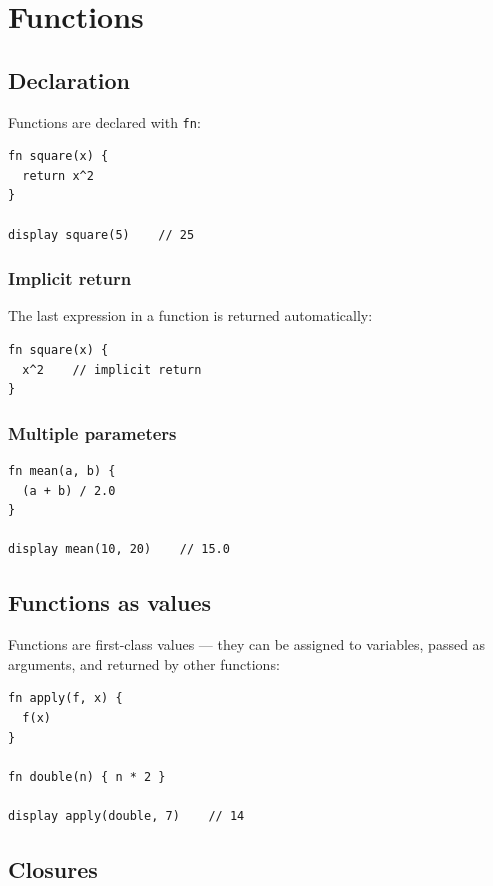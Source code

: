 \chapter{Functions}

\section{Declaration}

Functions are declared with \lstinline{fn}:

\begin{lstlisting}[caption={Basic function}]
fn square(x) {
  return x^2
}

display square(5)    // 25
\end{lstlisting}

\subsection*{Implicit return}

The last expression in a function is returned automatically:

\begin{lstlisting}
fn square(x) {
  x^2    // implicit return
}
\end{lstlisting}

\subsection*{Multiple parameters}

\begin{lstlisting}
fn mean(a, b) {
  (a + b) / 2.0
}

display mean(10, 20)    // 15.0
\end{lstlisting}

\section{Functions as values}

Functions are first-class values — they can be assigned to variables,
passed as arguments, and returned by other functions:

\begin{lstlisting}[caption={Function as argument}]
fn apply(f, x) {
  f(x)
}

fn double(n) { n * 2 }

display apply(double, 7)    // 14
\end{lstlisting}

\section{Closures}

